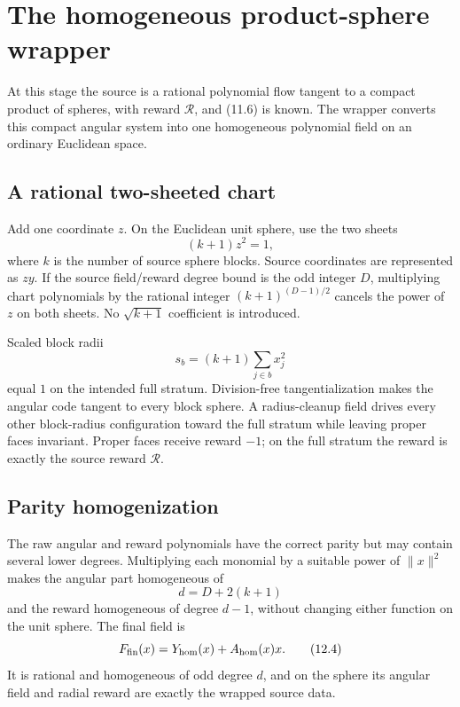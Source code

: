 \documentclass[11pt]{article}
\begin{document}
\section{The homogeneous product-sphere wrapper}
\label{sec:wrapper}

At this stage the source is a rational polynomial flow tangent to a compact
product of spheres, with reward \(\mathcal R\), and (11.6) is known.  The
wrapper converts this compact angular system into one homogeneous polynomial
field on an ordinary Euclidean space.

\subsection{A rational two-sheeted chart}

Add one coordinate \(z\).  On the Euclidean unit sphere, use the two sheets
\[
                    (k+1)z^2=1,
\tag{12.1}
\]
where \(k\) is the number of source sphere blocks.  Source coordinates are
represented as \(zy\).  If the source field/reward degree bound is the odd
integer \(D\), multiplying chart polynomials by the rational integer
\((k+1)^{(D-1)/2}\) cancels the power of \(z\) on both sheets.  No
\(\sqrt{k+1}\) coefficient is introduced.

Scaled block radii
\[
             s_b=(k+1)\sum_{j\in b}x_j^2
\tag{12.2}
\]
equal \(1\) on the intended full stratum.  Division-free
tangentialization makes the angular code tangent to every block sphere.
A radius-cleanup field drives every other block-radius configuration toward
the full stratum while leaving proper faces invariant.  Proper faces
receive reward \(-1\); on the full stratum the reward is exactly the source
reward \(\mathcal R\).

\subsection{Parity homogenization}

The raw angular and reward polynomials have the correct parity but may
contain several lower degrees.  Multiplying each monomial by a suitable
power of \(\|x\|^2\) makes the angular part homogeneous of
\[
                         d=D+2(k+1)
\tag{12.3}
\]
and the reward homogeneous of degree \(d-1\), without changing either
function on the unit sphere.  The final field is
\[
                           F_{\rm fin}(x)
                  =Y_{\rm hom}(x)+A_{\rm hom}(x)x.
\tag{12.4}
\]
It is rational and homogeneous of odd degree \(d\), and on the sphere its
angular field and radial reward are exactly the wrapped source data.
\end{document}
